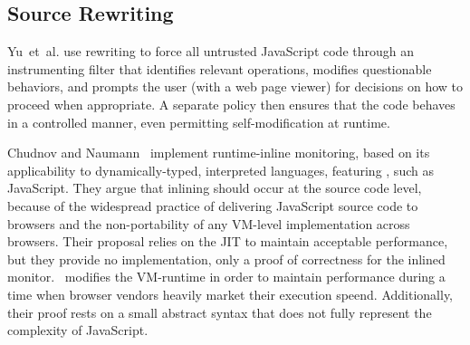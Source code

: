 \subsection{Source Rewriting}

Yu~et~al.\cite{yu.etal+07} use rewriting to force all untrusted JavaScript code through an instrumenting filter that identifies relevant operations, modifies questionable behaviors, and prompts the user (with a web page viewer) for decisions on how to proceed when appropriate.
A separate policy then ensures that the code behaves in a controlled manner, even permitting self-modification at runtime.

Chudnov and Naumann~\cite{chudnov.naumann+10} implement runtime-inline monitoring, based on its applicability to dynamically-typed, interpreted languages, featuring , such as JavaScript.
They argue that inlining should occur at the source code level, because of the widespread practice of delivering JavaScript source code to browsers and the non-portability of any VM-level implementation across browsers.
Their proposal relies on the JIT to maintain acceptable performance, but they provide no implementation, only a proof of correctness for the inlined monitor.
\FlowCore\ modifies the VM-runtime in order to maintain performance during a time when browser vendors heavily market their execution speend.
Additionally, their proof rests on a small abstract syntax that does not fully represent the complexity of JavaScript.

